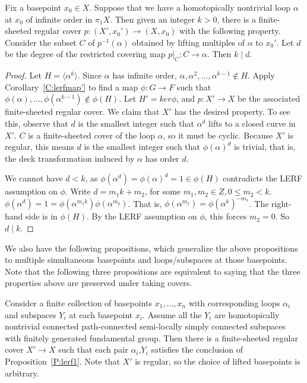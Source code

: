 \begin{prop}\label{P:lerf3}

Fix a basepoint $x_0 \in X$.  Suppose that we have a homotopically nontrivial
loop $\alpha$ at $x_0$ of infinite order in $\pi_1X$.  Then given an integer
$k>0$, there is a finite-sheeted regular cover $p \colon (X',x_0') \to (X,x_0)$
with the following property.  Consider the subset $C$ of $p^{-1}(\alpha)$
obtained by lifting multiples of $\alpha$ to $x_0'$. Let $d$ be the degree of
the restricted covering map $p|_C \colon C \to \alpha$. Then $k \mid d$.

\end{prop}

\begin{proof}

Let $H = \langle\alpha^k\rangle$. Since $\alpha$ has infinite order,
$\alpha,\alpha^2,\dots,\alpha^{k-1} \notin H$. Apply Corollary~\ref{C:lerfmap'}
to find a map $\phi \colon G \to F$ such that
$\phi(\alpha),\dots,\phi(\alpha^{k-1}) \notin \phi(H)$. Let $H' = ker \phi$,
and $p \colon X' \to X$ be the associated finite-sheeted regular cover.  We
claim that $X'$ has the desired property. To see this, observe that $d$ is the
smallest integer such that $\alpha^d$ lifts to a closed curve in $X'$. $C$ is
a finite-sheeted cover of the loop $\alpha$, so it must be cyclic. Because $X'$
is regular, this means $d$ is the smallest integer such that $\phi(\alpha)^d$
is trivial, that is, the deck transformation induced by $\alpha$ has order $d$.

We cannot have $d<k$, as $\phi(\alpha^d)=\phi(\alpha)^d=1 \in \phi(H)$
contradicts the LERF assumption on $\phi$. Write $d = m_1k + m_2$, for some
$m_1,m_2 \in Z, 0 \leq m_2 < k$.
$\phi(\alpha^d)=1=\phi(\alpha^{m_1k})\phi(\alpha^{m_2})$.  That is,
$\phi(\alpha^{m_2})=\phi(\alpha^k)^{-m_1}$. The right-hand side is in
$\phi(H)$.  By the LERF assumption on $\phi$, this forces $m_2=0$. So $d \mid
k$.

\end{proof}

We also have the following propositions, which generalize the above
propositions to multiple simultaneous basepoints and loops/subspaces at those
basepoints. Note that the following three propositions are equivalent to saying
that the three properties above are preserved under taking covers.

\begin{prop}\label{P:lerf1'}

Consider a finite collection of basepoints $x_1,\dots,x_n$ with corresponding
loops $\alpha_i$ and subspaces $Y_i$ at each basepoint $x_i$. Assume all the
$Y_i$ are homotopically nontrivial connected path-connected semi-locally simply
connected subspaces with finitely generated fundamental group. Then there is
a finite-sheeted regular cover $X' \to X$ such that each pair $\alpha_i$,$Y_i$
satisfies the conclusion of Proposition~\ref{P:lerf1}.  Note that $X'$ is
regular, so the choice of lifted basepoints is arbitrary.

\end{prop}

